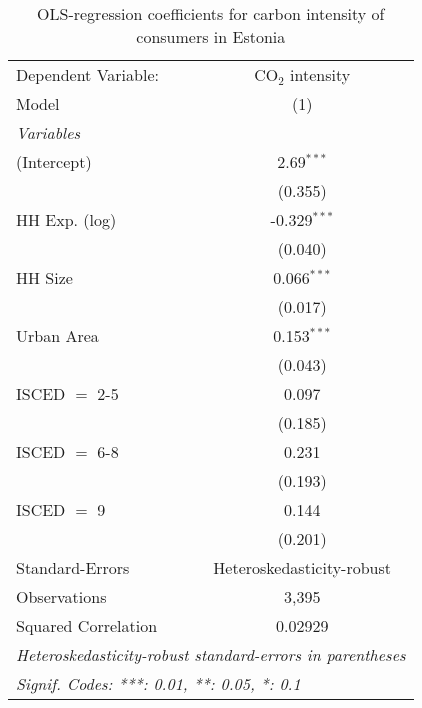 
\begin{table}[htbp!]
   \centering
   \small
   \begin{adjustbox}{width = 1\textwidth, max height = 0.95\textheight, center}
      \begin{threeparttable}[b]
         \caption{\label{tab:OLS_1_EST} OLS-regression coefficients for carbon intensity of consumers in Estonia}
         \begin{tabular}{lc}
            \tabularnewline \midrule \midrule
            Dependent Variable: & CO$_{2}$ intensity\\  
            Model               & (1)\\  
            \midrule
            \emph{Variables}\\
            (Intercept)         & 2.69$^{***}$\\   
                                & (0.355)\\   
            HH Exp. (log)       & -0.329$^{***}$\\   
                                & (0.040)\\   
            HH Size             & 0.066$^{***}$\\   
                                & (0.017)\\   
            Urban Area          & 0.153$^{***}$\\   
                                & (0.043)\\   
            ISCED $=$ 2-5       & 0.097\\   
                                & (0.185)\\   
            ISCED $=$ 6-8       & 0.231\\   
                                & (0.193)\\   
            ISCED $=$ 9         & 0.144\\   
                                & (0.201)\\   
            \midrule 
            Standard-Errors     & Heteroskedasticity-robust \\   
            Observations        & 3,395\\  
            Squared Correlation & 0.02929\\  
            \midrule \midrule
            \multicolumn{2}{l}{\emph{Heteroskedasticity-robust standard-errors in parentheses}}\\
            \multicolumn{2}{l}{\emph{Signif. Codes: ***: 0.01, **: 0.05, *: 0.1}}\\
         \end{tabular}
         

\end{threeparttable}
\end{adjustbox}
\end{table}
